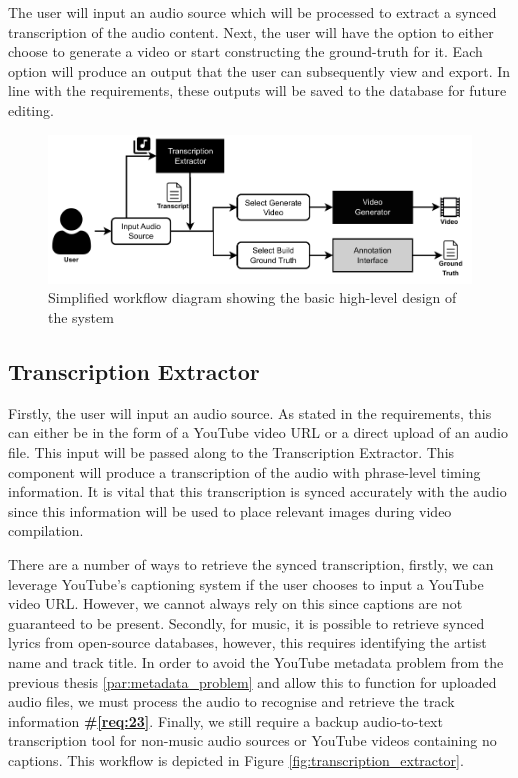 \documentclass{l4proj}
\begin{document}
The user will input an audio source which will be processed to extract a synced transcription of the audio content. Next, the user will have the option to either choose to generate a video or start constructing the ground-truth for it. Each option will produce an output that the user can subsequently view and export. In line with the requirements, these outputs will be saved to the database for future editing.

\begin{figure}[h]
    \centering
    \includegraphics[width=1\textwidth]{figures/simplified_architecture.pdf}
    \caption{Simplified workflow diagram showing the basic high-level design of the system}
    \label{fig:simplified_workflow}
\end{figure}

\subsection{Transcription Extractor}
Firstly, the user will input an audio source. As stated in the requirements, this can either be in the form of a YouTube video URL or a direct upload of an audio file. This input will be passed along to the Transcription Extractor. This component will produce a transcription of the audio with phrase-level timing information. It is vital that this transcription is synced accurately with the audio since this information will be used to place relevant images during video compilation.

There are a number of ways to retrieve the synced transcription, firstly, we can leverage YouTube's captioning system if the user chooses to input a YouTube video URL. However, we cannot always rely on this since captions are not guaranteed to be present. Secondly, for music, it is possible to retrieve synced lyrics from open-source databases, however, this requires identifying the artist name and track title. In order to avoid the YouTube metadata problem from the previous thesis \ref{par:metadata_problem} and allow this to function for uploaded audio files, we must process the audio to recognise and retrieve the track information \textbf{\#\ref{req:23}}. Finally, we still require a backup audio-to-text transcription tool for non-music audio sources or YouTube videos containing no captions. This workflow is depicted in Figure \ref{fig:transcription_extractor}.
\end{document}
